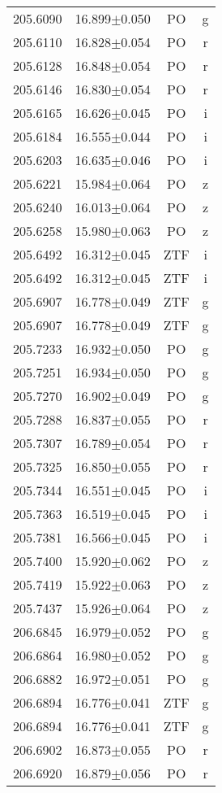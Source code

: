 \begin{table}
\begin{tabular}{cccc}
205.6090 & 16.899$\pm$0.050 & PO & g \\
205.6110 & 16.828$\pm$0.054 & PO & r \\
205.6128 & 16.848$\pm$0.054 & PO & r \\
205.6146 & 16.830$\pm$0.054 & PO & r \\
205.6165 & 16.626$\pm$0.045 & PO & i \\
205.6184 & 16.555$\pm$0.044 & PO & i \\
205.6203 & 16.635$\pm$0.046 & PO & i \\
205.6221 & 15.984$\pm$0.064 & PO & z \\
205.6240 & 16.013$\pm$0.064 & PO & z \\
205.6258 & 15.980$\pm$0.063 & PO & z \\
205.6492 & 16.312$\pm$0.045 & ZTF & i \\
205.6492 & 16.312$\pm$0.045 & ZTF & i \\
205.6907 & 16.778$\pm$0.049 & ZTF & g \\
205.6907 & 16.778$\pm$0.049 & ZTF & g \\
205.7233 & 16.932$\pm$0.050 & PO & g \\
205.7251 & 16.934$\pm$0.050 & PO & g \\
205.7270 & 16.902$\pm$0.049 & PO & g \\
205.7288 & 16.837$\pm$0.055 & PO & r \\
205.7307 & 16.789$\pm$0.054 & PO & r \\
205.7325 & 16.850$\pm$0.055 & PO & r \\
205.7344 & 16.551$\pm$0.045 & PO & i \\
205.7363 & 16.519$\pm$0.045 & PO & i \\
205.7381 & 16.566$\pm$0.045 & PO & i \\
205.7400 & 15.920$\pm$0.062 & PO & z \\
205.7419 & 15.922$\pm$0.063 & PO & z \\
205.7437 & 15.926$\pm$0.064 & PO & z \\
206.6845 & 16.979$\pm$0.052 & PO & g \\
206.6864 & 16.980$\pm$0.052 & PO & g \\
206.6882 & 16.972$\pm$0.051 & PO & g \\
206.6894 & 16.776$\pm$0.041 & ZTF & g \\
206.6894 & 16.776$\pm$0.041 & ZTF & g \\
206.6902 & 16.873$\pm$0.055 & PO & r \\
206.6920 & 16.879$\pm$0.056 & PO & r \\

\end{tabular}
\end{table}
